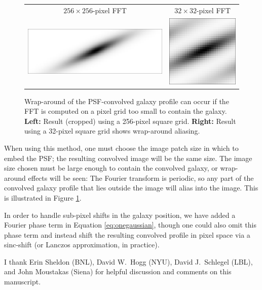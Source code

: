 \documentclass[11pt,preprint]{aastex}
\newcommand{\eqnref}[1]{Equation \ref{#1}}
\newcommand{\trick}{method}
\begin{document}
\begin{figure}
\begin{center}
\begin{tabular}{@{}cc@{}}
  $256 \times 256$-pixel FFT &
  $32 \times 32$-pixel FFT \\
  \includegraphics[height=0.22\textwidth]{gal-00} &
  \includegraphics[height=0.22\textwidth]{gal-01} \\
\end{tabular}
\end{center}
\caption{\label{fig:wrap}%
  Wrap-around of the PSF-convolved galaxy profile can occur if the FFT is
  computed on a pixel grid too small to contain the galaxy.
  \textbf{Left:} Result (cropped) using a 256-pixel square grid.
  \textbf{Right:} Result using a 32-pixel square grid shows wrap-around
  aliasing.
}
\end{figure}


When using this \trick, one must choose the image patch size in which
to embed the PSF; the resulting convolved image will be the same size.
The image size chosen must be large enough to contain the convolved
galaxy, or wrap-around effects will be seen: The Fourier transform is
periodic, so any part of the convolved galaxy profile that lies
outside the image will alias into the image.  This is
illustrated in Figure \ref{fig:wrap}.

In order to handle sub-pixel shifts in the galaxy position, we have
added a Fourier phase term in \eqnref{eq:onegaussian}, though one
could also omit this phase term and instead shift the resulting
convolved profile in pixel space via a sinc-shift (or Lanczos
approximation, in practice).




\acknowledgements

I thank Erin Sheldon (BNL),
David W.~Hogg (NYU), David J.~Schlegel (LBL), and John Moustakas (Siena)
for helpful discussion and comments on this manuscript.
\end{document}
